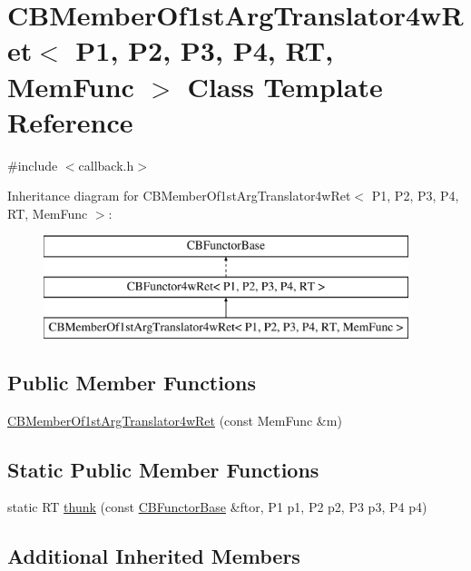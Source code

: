 \hypertarget{class_c_b_member_of1st_arg_translator4w_ret}{\section{C\+B\+Member\+Of1st\+Arg\+Translator4w\+Ret$<$ P1, P2, P3, P4, R\+T, Mem\+Func $>$ Class Template Reference}
\label{class_c_b_member_of1st_arg_translator4w_ret}
}


{\ttfamily \#include $<$callback.\+h$>$}

Inheritance diagram for C\+B\+Member\+Of1st\+Arg\+Translator4w\+Ret$<$ P1, P2, P3, P4, R\+T, Mem\+Func $>$\+:\begin{figure}[H]
\begin{center}
\leavevmode
\includegraphics[height=3.000000cm]{class_c_b_member_of1st_arg_translator4w_ret}
\end{center}
\end{figure}
\subsection*{Public Member Functions}
\begin{DoxyCompactItemize}
\item 
\hyperlink{class_c_b_member_of1st_arg_translator4w_ret_a26df225ad41821d1b66bbe2d52a1af49}{C\+B\+Member\+Of1st\+Arg\+Translator4w\+Ret} (const Mem\+Func \&m)
\end{DoxyCompactItemize}
\subsection*{Static Public Member Functions}
\begin{DoxyCompactItemize}
\item 
static R\+T \hyperlink{class_c_b_member_of1st_arg_translator4w_ret_a941353b6cd743478e22eb62bba0e4ca4}{thunk} (const \hyperlink{class_c_b_functor_base}{C\+B\+Functor\+Base} \&ftor, P1 p1, P2 p2, P3 p3, P4 p4)
\end{DoxyCompactItemize}
\subsection*{Additional Inherited Members}



